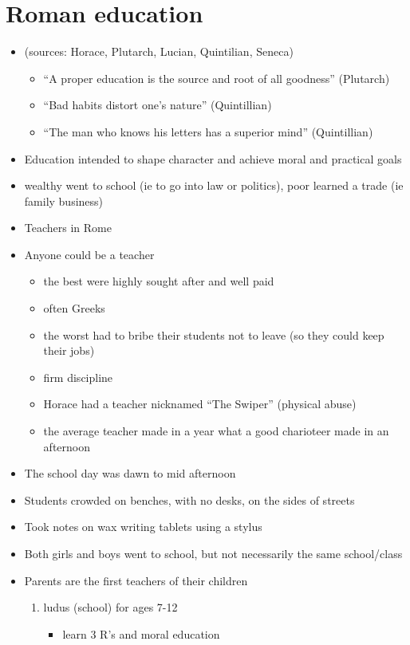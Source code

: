 \documentclass[12pt, twoside]{article}
\begin{document}
\section{Roman education}
\begin{itemize}
\item(sources: Horace, Plutarch, Lucian, Quintilian, Seneca)
	\begin{itemize}
	\item “A proper education is the source and root of all goodness” (Plutarch)
	\item “Bad habits distort one’s nature” (Quintillian)
	\item “The man who knows his letters has a superior mind” (Quintillian)
	\end{itemize}
\item Education intended to shape character and achieve moral and practical goals
\item wealthy went to school (ie to go into law or politics), poor learned a trade (ie family business)
\item Teachers in Rome
\item Anyone could be a teacher
	\begin{itemize}
	\item the best were highly sought after and well paid
	\item often Greeks
	\item the worst had to bribe their students not to leave (so they could keep their jobs)
	\item firm discipline
	\item Horace had a teacher nicknamed “The Swiper” (physical abuse)
	\item the average teacher made in a year what a good charioteer made in an afternoon
	\end{itemize}
\item The school day was dawn to mid afternoon
\item Students crowded on benches, with no desks, on the sides of streets 
\item Took notes on wax writing tablets using a stylus
\item Both girls and boys went to school, but not necessarily the same school/class
\item Parents are the first teachers of their children
	\begin{enumerate}
	\item ludus (school) for ages 7-12
		\begin{itemize}
		\item learn 3 R’s and moral education

\end{itemize}
\end{enumerate}
\end{itemize}
\end{document}
